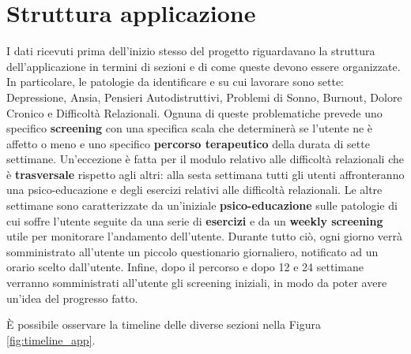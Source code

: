 \section{Struttura applicazione}
\label{chap:struttura_applicazione}
I dati ricevuti prima dell'inizio stesso del progetto riguardavano la struttura dell'applicazione in termini di sezioni e di come queste devono essere organizzate. In particolare, le patologie da identificare e su cui lavorare sono sette: Depressione, Ansia, Pensieri Autodistruttivi, Problemi di Sonno, Burnout, Dolore Cronico e Difficoltà Relazionali. Ognuna di queste problematiche prevede uno specifico \textbf{screening} con una specifica scala che determinerà se l'utente ne è affetto o meno e uno specifico \textbf{percorso terapeutico} della durata di sette settimane. Un'eccezione è fatta per il modulo relativo alle difficoltà relazionali che è \textbf{trasversale} rispetto agli altri: alla sesta settimana tutti gli utenti affronteranno una psico-educazione e degli esercizi relativi alle difficoltà relazionali. Le altre settimane sono caratterizzate da un'iniziale \textbf{psico-educazione} sulle patologie di cui soffre l'utente seguite da una serie di \textbf{esercizi} e da un \textbf{weekly screening} utile per monitorare l'andamento dell'utente. Durante tutto ciò, ogni giorno verrà somministrato all'utente un piccolo questionario giornaliero, notificato ad un orario scelto dall'utente.
Infine, dopo il percorso e dopo 12 e 24 settimane verranno somministrati all'utente gli screening iniziali, in modo da poter avere un'idea del progresso fatto.

È possibile osservare la timeline delle diverse sezioni nella Figura \ref{fig:timeline_app}.

